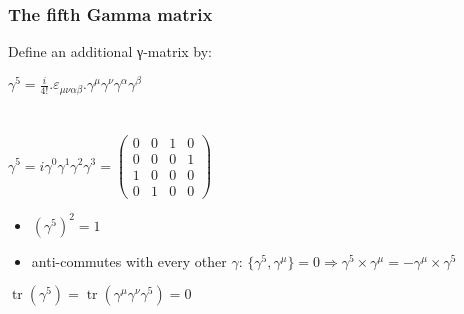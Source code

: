 \label{The fifth Gamma matrix}
\begin{frame}\frametitle{The fifth Gamma matrix}

Define an additional γ-matrix by:\\

\begin{center}
 $\gamma ^{5}={\frac {i}{4!}} . \varepsilon _{\mu \nu \alpha \beta }.\gamma ^{\mu }\gamma ^{\nu }\gamma ^{\alpha }\gamma ^{\beta }$
\\
\\
\\ 
${\displaystyle \gamma ^{5}=i\gamma ^{0}\gamma ^{1}\gamma ^{2}\gamma ^{3}={\begin{pmatrix}0&0&1&0\\0&0&0&1\\1&0&0&0\\0&1&0&0\end{pmatrix}}}$

 
\end{center}


\begin{itemize}
 \item  $(\gamma^5)^2 = 1$
\item anti-commutes with every other $\gamma$:
$\{\gamma^5,\gamma^\mu\}=0 \Longrightarrow \gamma^5\times \gamma^\mu = - \gamma^\mu \times \gamma^5 $
 
\end{itemize}



$\operatorname {tr} \left(\gamma ^{5}\right)=\operatorname {tr} \left(\gamma ^{\mu }\gamma ^{\nu }\gamma ^{5}\right)=0$


\end{frame}



\label{The fifth Gamma matrix}

